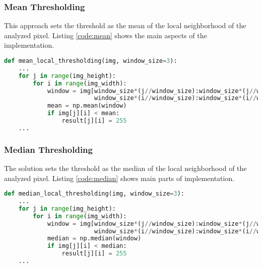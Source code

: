 \documentclass[]{IEEEtran}
\begin{document}
\subsubsection{Mean Thresholding}
This approach sets the threshold as the mean of the local neighborhood of the analyzed pixel. Listing \ref{code:mean} shows the main aspects of the implementation.

\begin{lstlisting}[language=Python, caption={Mean Thresholding Implementation}, label={code:mean}]
  def mean_local_thresholding(img, window_size=3):
    ...
    for j in range(img_height):
        for i in range(img_width):
            window = img[window_size*(j//window_size):window_size*(j//window_size) + window_size,
                         window_size*(i//window_size):window_size*(i//window_size) + window_size]
            mean = np.mean(window)
            if img[j][i] < mean:
                result[j][i] = 255
    ...
\end{lstlisting}

\subsubsection{Median Thresholding}
The solution sets the threshold as the median of the local neighborhood of the analyzed pixel. Listing \ref{code:median} shows main parts of implementation.

\begin{lstlisting}[language=Python, caption={Median Thresholding Implementation}, label={code:median}]
  def median_local_thresholding(img, window_size=3):
    ...
    for j in range(img_height):
        for i in range(img_width):
            window = img[window_size*(j//window_size):window_size*(j//window_size) + window_size,
                         window_size*(i//window_size):window_size*(i//window_size) + window_size]
            median = np.median(window)
            if img[j][i] < median:
                result[j][i] = 255
    ...
\end{lstlisting}

\end{document}
